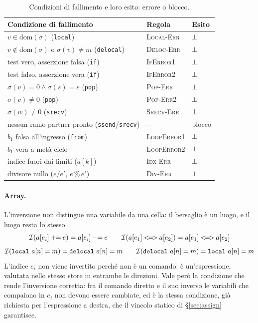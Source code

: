 \begin{table}[H]
\centering
\renewcommand{\arraystretch}{1.25}
\begin{tabular}{l l l}
\hline
\textbf{Condizione di fallimento} & \textbf{Regola} & \textbf{Esito}\\
\hline
$v \in \mathrm{dom}(\sigma)$ (\texttt{local}) & \textcolor{red!60!black}{\textsc{Local-Err}} & $\bot$\\
$v \notin \mathrm{dom}(\sigma)$ o $\sigma(v) \neq m$ (\texttt{delocal}) & \textcolor{red!60!black}{\textsc{Deloc-Err}} & $\bot$\\
test vero, asserzione falsa (\texttt{if}) & \textcolor{red!60!black}{\textsc{IfError1}} & $\bot$\\
test falso, asserzione vera (\texttt{if}) & \textcolor{red!60!black}{\textsc{IfError2}} & $\bot$\\
$\sigma(v) = 0 \land \sigma(s) = \varepsilon$ (\texttt{pop}) & \textcolor{red!60!black}{\textsc{Pop-Err}} & $\bot$\\
$\sigma(v) \neq 0$ (\texttt{pop}) & \textcolor{red!60!black}{\textsc{Pop-Err2}} & $\bot$\\
$\sigma(\bar w) \neq \bar 0$ (\texttt{srecv}) & \textcolor{red!60!black}{\textsc{Srecv-Err}} & $\bot$\\
nessun ramo partner pronto (\texttt{ssend}/\texttt{srecv}) & $-$ & blocco\\
$b_1$ falsa all'ingresso (\texttt{from}) & \textcolor{red!60!black}{\textsc{LoopError1}} & $\bot$\\
$b_1$ vera a metà ciclo & \textcolor{red!60!black}{\textsc{LoopError2}} & $\bot$\\
indice fuori dai limiti ($a[k]$) & \textcolor{red!60!black}{\textsc{Idx-Err}} & $\bot$\\
divisore nullo ($e/e'$, $e\,\%\,e'$) & \textcolor{red!60!black}{\textsc{Div-Err}} & $\bot$\\
\hline
\end{tabular}
\caption{Condizioni di fallimento e loro esito: errore o blocco.}
\label{tab:fallimenti}
\end{table}

\paragraph{Array.} L'inversione non distingue una variabile da una cella: il
bersaglio è un luogo, e il luogo resta lo stesso.
\[
\Inv{a[e_i] \mathbin{+\!\!=} e} = a[e_i] \mathbin{-\!\!=} e
\qquad
\Inv{a[e_1] \mathbin{<\!=\!>} a[e_2]} = a[e_1] \mathbin{<\!=\!>} a[e_2]
\]
\[
\mathcal{I}(\mathtt{local}\ a[n] = m) = \mathtt{delocal}\ a[n] = m
\qquad
\mathcal{I}(\mathtt{delocal}\ a[n] = m) = \mathtt{local}\ a[n] = m
\]
L'indice $e_i$ non viene invertito perché non è un comando: è un'espressione,
valutata nello stesso store in entrambe le direzioni. Vale però la condizione
che rende l'inversione corretta: fra il comando diretto e il suo inverso le
variabili che compaiono in $e_i$ non devono essere cambiate, ed è la stessa
condizione, già richiesta per l'espressione a destra, che il vincolo statico di
\S\ref{sec:assign} garantisce.

